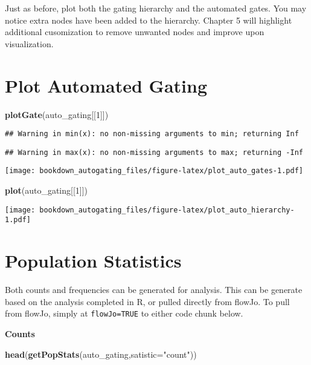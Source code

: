 \documentclass[]{book}
\newenvironment{Shaded}{\begin{snugshade}}{\end{snugshade}}
\newcommand{\DataTypeTok}[1]{\textcolor[rgb]{0.13,0.29,0.53}{#1}}
\newcommand{\DecValTok}[1]{\textcolor[rgb]{0.00,0.00,0.81}{#1}}
\newcommand{\KeywordTok}[1]{\textcolor[rgb]{0.13,0.29,0.53}{\textbf{#1}}}
\newcommand{\NormalTok}[1]{#1}
\newcommand{\StringTok}[1]{\textcolor[rgb]{0.31,0.60,0.02}{#1}}
\begin{document}
Just as before, plot both the gating hierarchy and the automated gates. You may notice extra nodes have been added to the hierarchy. Chapter 5 will highlight additional cusomization to remove unwanted nodes and improve upon visualization.

\hypertarget{plot-automated-gating}{%
\section{Plot Automated Gating}\label{plot-automated-gating}}

\begin{Shaded}
\begin{Highlighting}[]
\KeywordTok{plotGate}\NormalTok{(auto_gating[[}\DecValTok{1}\NormalTok{]])}
\end{Highlighting}
\end{Shaded}

\begin{verbatim}
## Warning in min(x): no non-missing arguments to min; returning Inf
\end{verbatim}

\begin{verbatim}
## Warning in max(x): no non-missing arguments to max; returning -Inf
\end{verbatim}

\texttt{[image: bookdown\_autogating\_files/figure-latex/plot\_auto\_gates-1.pdf]}

\begin{Shaded}
\begin{Highlighting}[]
\KeywordTok{plot}\NormalTok{(auto_gating[[}\DecValTok{1}\NormalTok{]])}
\end{Highlighting}
\end{Shaded}

\texttt{[image: bookdown\_autogating\_files/figure-latex/plot\_auto\_hierarchy-1.pdf]}

\hypertarget{population-statistics}{%
\section{Population Statistics}\label{population-statistics}}

Both counts and frequencies can be generated for analysis. This can be generate based on the analysis completed in R, or pulled directly from flowJo. To pull from flowJo, simply at \texttt{flowJo=TRUE} to either code chunk below.

\textbf{Counts}

\begin{Shaded}
\begin{Highlighting}[]
\KeywordTok{head}\NormalTok{(}\KeywordTok{getPopStats}\NormalTok{(auto_gating,}\DataTypeTok{satistic=}\StringTok{"count"}\NormalTok{))}
\end{Highlighting}
\end{Shaded}
\end{document}
